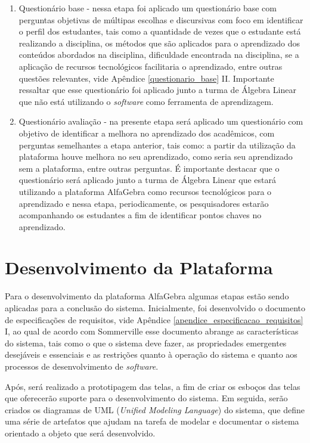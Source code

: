 \begin{enumerate}
    \item Questionário base - nessa etapa foi aplicado um questionário base com perguntas objetivas de múltipas escolhas e discursivas com foco em identificar o perfil dos estudantes, tais como a quantidade de vezes que o estudante está realizando a disciplina, os métodos que são aplicados para o aprendizado dos conteúdos abordados na disciplina, dificuldade encontrada na disciplina, se a aplicação de recursos tecnológicos facilitaria o aprendizado, entre outras questões relevantes, vide Apêndice \ref{questionario_base} II. Importante ressaltar que esse questionário foi aplicado junto a turma de Álgebra Linear que não está utilizando o \textit{software} como ferramenta de aprendizagem.
    
    \item Questionário avaliação - na presente etapa será aplicado um questionário com objetivo de identificar a melhora no aprendizado dos acadêmicos, com perguntas semelhantes a etapa anterior, tais como: a partir da utilização da plataforma houve melhora no seu aprendizado, como seria seu aprendizado sem a plataforma, entre outras perguntas. É importante destacar que o questionário será aplicado junto a turma de Álgebra Linear que estará utilizando a plataforma AlfaGebra como recursos tecnológicos para o aprendizado e nessa etapa, periodicamente, os pesquisadores estarão acompanhando os estudantes a fim de identificar pontos chaves no aprendizado.
\end{enumerate}


\section{Desenvolvimento da Plataforma}
\noindent Para o desenvolvimento da plataforma AlfaGebra algumas etapas estão sendo aplicadas para a conclusão do sistema. Inicialmente, foi desenvolvido o documento de especificações de requisitos, vide Apêndice \ref{apendice_especificacao_requisitos} I, ao qual de acordo com Sommerville \cite{2013:Sommerville} esse documento abrange as características do sistema, tais como o que o sistema deve fazer, as propriedades emergentes desejáveis e essenciais e as restrições quanto à operação do sistema e quanto aos processos de desenvolvimento de \textit{software}. 

Após, será realizado a prototipagem das telas, a fim de criar os esboços das telas que oferecerão suporte para o desenvolvimento do sistema. Em seguida, serão criados os diagramas de UML (\textit{Unified Modeling Language}) do sistema, que define uma série de artefatos que ajudam na tarefa de modelar e documentar o sistema orientado a objeto que será desenvolvido.

